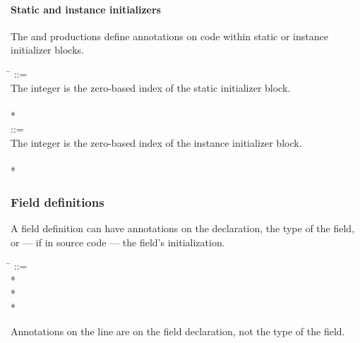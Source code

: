\documentclass{article}
\begin{document}
\paragraph{Static and instance initializers}

The  and  productions
define annotations on code within static or instance initializer blocks.

\begin{tabbing}
\qquad \= \kill
{} ::= \\
\qquad    \bnfcmt The integer is the zero-based index of the static initializer block. \\
\qquad    {} \bnflit{*}  \bnflit{:} \lineend  \\
\qquad        {}*
\\
 ::= \\
\qquad    \bnfcmt The integer is the zero-based index of the instance initializer block. \\
\qquad    {} \bnflit{*}  \bnflit{:} \lineend  \\
\qquad        {}*
\end{tabbing}


\subsubsection{Field definitions}\label{field-definitions}

A field definition can have annotations on the declaration, the type of the
field, or --- if in source code --- the field's initialization.

\begin{tabbing}
\qquad \= \kill
{} ::= \\
\qquad    {}  \bnflit{:} * \lineend \\
\qquad        {}* \\
\qquad        {}*
\end{tabbing}

\noindent
Annotations on the  line are on the field declaration, not the
type of the field.
\end{document}
